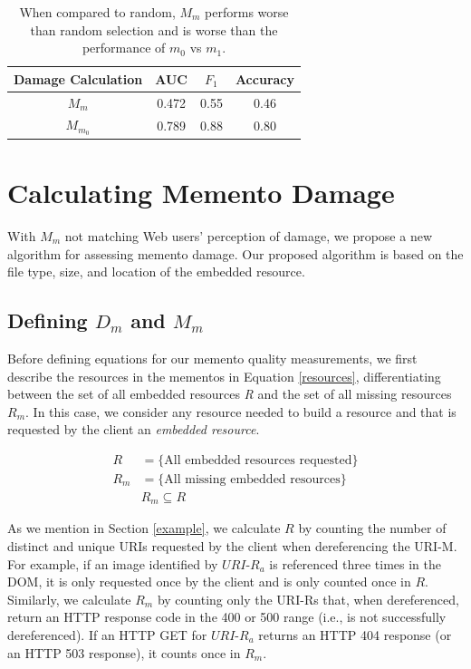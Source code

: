 \begin{table}
\centering
\begin{tabular}{ c | c | c | c }
    Damage Calculation &  AUC & $F_1$ & Accuracy\\
\hline
  $M_m$ & 0.472 & 0.55 & 0.46\\
  $M_{m_0}$ & 0.789 & 0.88 & 0.80 \\
\hline
\end{tabular}
  \caption{When compared to random, $M_m$ performs worse than random selection and is worse than the performance of $m_0$ vs $m_1$.}
  \label{auc1}
\end{table}




\section{Calculating Memento Damage}
\label{damage}
With $M_m$ not matching Web users' perception of damage, we propose a new algorithm for assessing memento damage. Our proposed algorithm is based on the file type, size, and location of the embedded resource.

\subsection{Defining $D_m$ and $M_m$}
Before defining equations for our memento quality measurements, we first describe the resources in the mementos in Equation \ref{resources}, differentiating between the set of all embedded resources \emph{R} and the set of all missing resources \emph{$R_m$}. In this case, we consider any resource needed to build a resource and that is requested by the client an \emph{embedded resource}.

\begin{equation}
\label{resources}
\begin{split}
R &= \{\text{All embedded resources requested}\}\\
R_m &= \{\text{All missing embedded resources}\}\\
&R_m \subseteq R
\end{split}
\end{equation}

As we mention in Section \ref{example}, we calculate $R$ by counting the number of distinct and unique URIs requested by the client when dereferencing the URI-M. For example, if an image identified by $\textit{URI-R}_a$ is referenced three times in the DOM, it is only requested once by the client and is only counted once in $R$. Similarly, we calculate $R_m$ by counting only the URI-Rs that, when dereferenced, return an HTTP response code in the 400 or 500 range (i.e., is not successfully dereferenced). If an HTTP GET for $\textit{URI-R}_a$ returns an HTTP 404 response (or an HTTP 503 response), it counts once in $R_m$.

